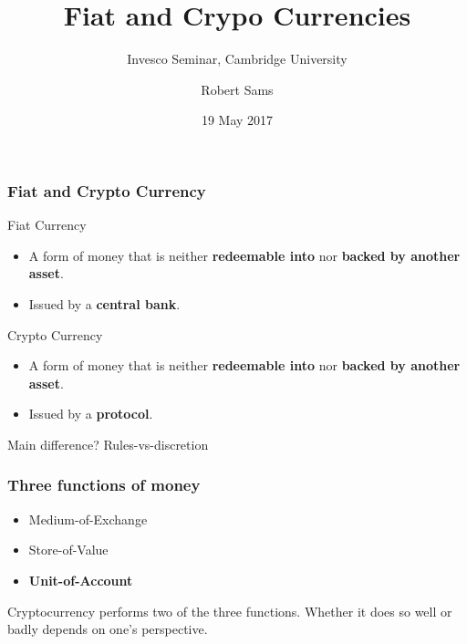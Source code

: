 \documentclass{beamer}
\title{\large Fiat and Crypo Currencies}
\subtitle{\small Invesco Seminar, Cambridge University}
\date{\small 19 May 2017}
\author{\small Robert Sams} %
\begin{document}
\begin{frame}
  \titlepage
\end{frame}


\begin{frame}
  \frametitle{Fiat and Crypto Currency}

  \begin{block}{Fiat Currency}
    \begin{itemize}
    \item A form of money that is neither \textbf{redeemable into} nor \textbf{backed by
        another asset}. 
    \item Issued by a \textbf{central bank}.
    \end{itemize}
  \end{block}
  
  \begin{block}{Crypto Currency}
    \begin{itemize}
    \item A form of money that is neither \textbf{redeemable into} nor \textbf{backed by
        another asset}.
    \item Issued by a \textbf{protocol}.
    \end{itemize}
  \end{block}

  \pause
  
  \begin{center}
    {\Large Main difference? Rules-vs-discretion}
  \end{center}
  
\end{frame}

\begin{frame}
  \frametitle{Three functions of money}

  \begin{itemize}
  \item Medium-of-Exchange
  \item Store-of-Value
  \item \textbf{Unit-of-Account}
  \end{itemize}

  \begin{block}{}
    Cryptocurrency performs two of the three functions. Whether it
    does so well or badly depends on one's perspective.
  \end{block}
  
\end{frame}
\end{document}
